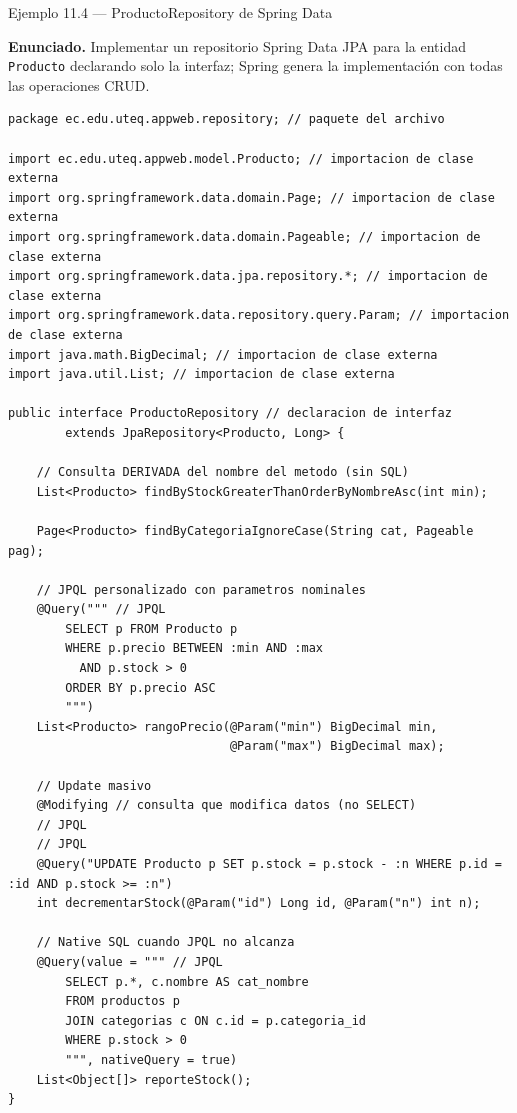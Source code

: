 \begin{cajaejemplo}{Ejemplo 11.4 --- ProductoRepository de Spring Data}

\textbf{Enunciado.} Implementar un repositorio Spring Data JPA para la entidad \texttt{Producto} declarando solo la interfaz; Spring genera la implementación con todas las operaciones CRUD.

\begin{lstlisting}[style=java,caption={ProductoRepository.java},label=lst:11.7]
package ec.edu.uteq.appweb.repository; // paquete del archivo

import ec.edu.uteq.appweb.model.Producto; // importacion de clase externa
import org.springframework.data.domain.Page; // importacion de clase externa
import org.springframework.data.domain.Pageable; // importacion de clase externa
import org.springframework.data.jpa.repository.*; // importacion de clase externa
import org.springframework.data.repository.query.Param; // importacion de clase externa
import java.math.BigDecimal; // importacion de clase externa
import java.util.List; // importacion de clase externa

public interface ProductoRepository // declaracion de interfaz
        extends JpaRepository<Producto, Long> {

    // Consulta DERIVADA del nombre del metodo (sin SQL)
    List<Producto> findByStockGreaterThanOrderByNombreAsc(int min);

    Page<Producto> findByCategoriaIgnoreCase(String cat, Pageable pag);

    // JPQL personalizado con parametros nominales
    @Query(""" // JPQL
        SELECT p FROM Producto p
        WHERE p.precio BETWEEN :min AND :max
          AND p.stock > 0
        ORDER BY p.precio ASC
        """)
    List<Producto> rangoPrecio(@Param("min") BigDecimal min,
                               @Param("max") BigDecimal max);

    // Update masivo
    @Modifying // consulta que modifica datos (no SELECT)
    // JPQL
    // JPQL
    @Query("UPDATE Producto p SET p.stock = p.stock - :n WHERE p.id = :id AND p.stock >= :n")
    int decrementarStock(@Param("id") Long id, @Param("n") int n);

    // Native SQL cuando JPQL no alcanza
    @Query(value = """ // JPQL
        SELECT p.*, c.nombre AS cat_nombre
        FROM productos p
        JOIN categorias c ON c.id = p.categoria_id
        WHERE p.stock > 0
        """, nativeQuery = true)
    List<Object[]> reporteStock();
}
\end{lstlisting}
\end{cajaejemplo}

